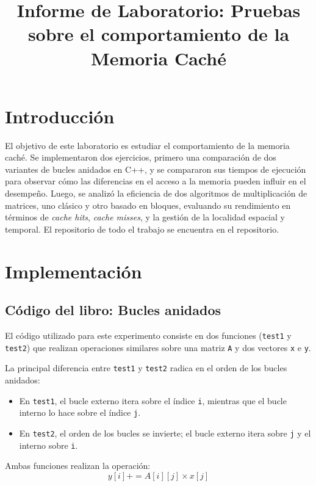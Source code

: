 \documentclass[conference]{IEEEtran}
\begin{document}
\title{Informe de Laboratorio: Pruebas sobre el comportamiento de la Memoria Caché}


\author{
}



\maketitle




\section{Introducción}
El objetivo de este laboratorio es estudiar el comportamiento de la memoria caché. Se implementaron dos ejercicios, 
primero una comparación de dos variantes de bucles anidados en C++, y se compararon sus tiempos de ejecución para 
observar cómo las diferencias en el acceso a la memoria pueden influir en el desempeño. Luego, se analizó la
 eficiencia de dos algoritmos de multiplicación de matrices, uno clásico y otro basado en bloques, evaluando 
 su rendimiento en términos de \textit{cache hits}, \textit{cache misses},
 y la gestión de la localidad espacial y temporal. El repositorio de todo el trabajo se encuentra en el repositorio\cite{repo}.

\section{Implementación}
\subsection{\textbf{Código del libro: Bucles anidados}}

El código utilizado para este experimento consiste en dos funciones (\texttt{test1} y \texttt{test2})
que realizan operaciones similares sobre una matriz \texttt{A} y dos vectores \texttt{x} e \texttt{y}.


La principal diferencia entre \texttt{test1} y \texttt{test2} radica en el orden de los bucles anidados:
\begin{itemize}
    \item  En \texttt{test1}, el bucle externo itera sobre el índice \texttt{i}, mientras que el bucle interno lo hace sobre el índice \texttt{j}.
    \item  En \texttt{test2}, el orden de los bucles se invierte; el bucle externo itera sobre \texttt{j} y el interno sobre \texttt{i}.
\end{itemize}
Ambas funciones realizan la operación:
\[
    y[i] += A[i][j] \times x[j]
\]
\end{document}
